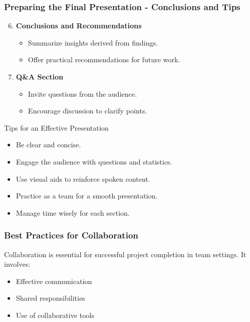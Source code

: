 \documentclass[aspectratio=169]{beamer}
\begin{document}
\begin{frame}[fragile]
    \frametitle{Preparing the Final Presentation - Conclusions and Tips}
    \begin{enumerate}
        \setcounter{enumi}{5} %
        \item \textbf{Conclusions and Recommendations}
        \begin{itemize}
            \item Summarize insights derived from findings.
            \item Offer practical recommendations for future work.
        \end{itemize}
        
        \item \textbf{Q\&A Section}
        \begin{itemize}
            \item Invite questions from the audience.
            \item Encourage discussion to clarify points.
        \end{itemize}
    \end{enumerate}

    \begin{block}{Tips for an Effective Presentation}
    \begin{itemize}
        \item Be clear and concise.
        \item Engage the audience with questions and statistics.
        \item Use visual aids to reinforce spoken content.
        \item Practice as a team for a smooth presentation.
        \item Manage time wisely for each section.
    \end{itemize}
    \end{block}
\end{frame}

\begin{frame}[fragile]
    \frametitle{Best Practices for Collaboration}
    Collaboration is essential for successful project completion in team settings. It involves:
    \begin{itemize}
        \item Effective communication
        \item Shared responsibilities
        \item Use of collaborative tools
    \end{itemize}
\end{frame}
\end{document}
